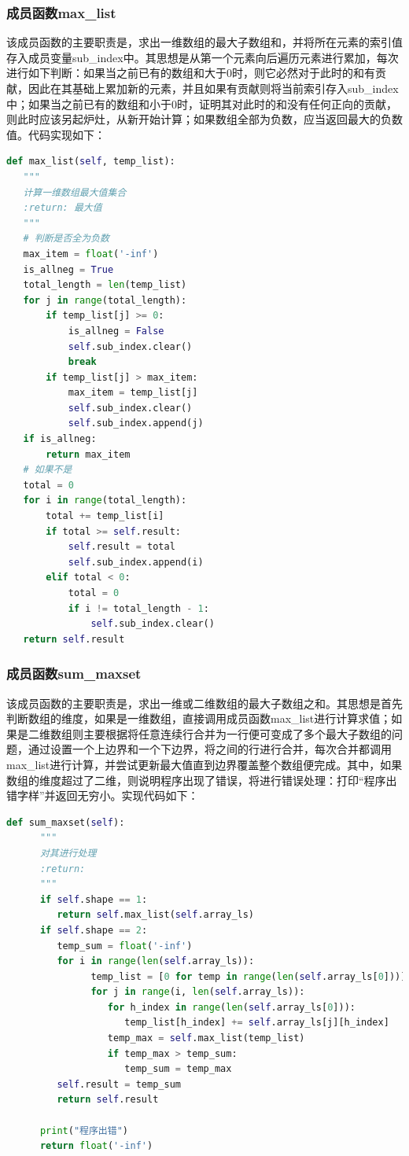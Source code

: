 \documentclass{article}
\begin{document}
\subsubsection{成员函数max\_list}
该成员函数的主要职责是，求出一维数组的最大子数组和，并将所在元素的索引值存入成员变量sub\_index中。其思想是从第一个元素向后遍历元素进行累加，每次进行如下判断：如果当之前已有的数组和大于0时，则它必然对于此时的和有贡献，因此在其基础上累加新的元素，并且如果有贡献则将当前索引存入sub\_index中；如果当之前已有的数组和小于0时，证明其对此时的和没有任何正向的贡献，则此时应该另起炉灶，从新开始计算；如果数组全部为负数，应当返回最大的负数值。代码实现如下：
\begin{lstlisting}[language = python]
def max_list(self, temp_list):
   """
   计算一维数组最大值集合
   :return: 最大值
   """
   # 判断是否全为负数
   max_item = float('-inf')
   is_allneg = True
   total_length = len(temp_list)
   for j in range(total_length):
       if temp_list[j] >= 0:
           is_allneg = False
           self.sub_index.clear()
           break
       if temp_list[j] > max_item:
           max_item = temp_list[j]
           self.sub_index.clear()
           self.sub_index.append(j)
   if is_allneg:
       return max_item
   # 如果不是
   total = 0
   for i in range(total_length):
       total += temp_list[i]
       if total >= self.result:
           self.result = total
           self.sub_index.append(i)
       elif total < 0:
           total = 0
           if i != total_length - 1:
               self.sub_index.clear()
   return self.result
\end{lstlisting}
\subsubsection{成员函数sum\_maxset}
该成员函数的主要职责是，求出一维或二维数组的最大子数组之和。其思想是首先判断数组的维度，如果是一维数组，直接调用成员函数max\_list进行计算求值；如果是二维数组则主要根据将任意连续行合并为一行便可变成了多个最大子数组的问题，通过设置一个上边界和一个下边界，将之间的行进行合并，每次合并都调用max\_list进行计算，并尝试更新最大值直到边界覆盖整个数组便完成。\textcolor[rgb]{0,0.8,1}{其中，如果数组的维度超过了二维，则说明程序出现了错误，将进行错误处理：打印“程序出错字样”并返回无穷小}。实现代码如下：
\begin{lstlisting}[language = python]
def sum_maxset(self):
      """
      对其进行处理
      :return:
      """
      if self.shape == 1:
         return self.max_list(self.array_ls)
      if self.shape == 2:
         temp_sum = float('-inf')
         for i in range(len(self.array_ls)):
               temp_list = [0 for temp in range(len(self.array_ls[0]))]
               for j in range(i, len(self.array_ls)):
                  for h_index in range(len(self.array_ls[0])):
                     temp_list[h_index] += self.array_ls[j][h_index]
                  temp_max = self.max_list(temp_list)
                  if temp_max > temp_sum:
                     temp_sum = temp_max
         self.result = temp_sum
         return self.result

      print("程序出错")
      return float('-inf')
\end{lstlisting}
\end{document}
